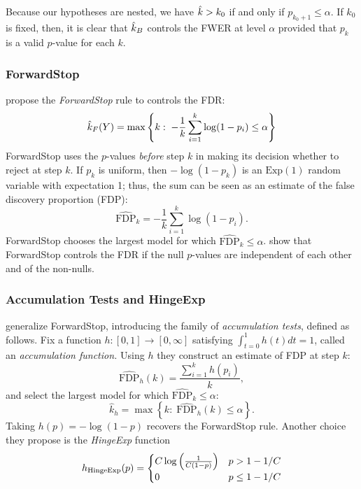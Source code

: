 \documentclass{article}
\begin{document}
Because our hypotheses are nested, we have $\hat{k} > k_0$ if and only if $p_{k_0+1} \leq \alpha$. If $k_0$ is fixed, then, it is clear that $\hat{k}_B$ controls the FWER at level $\alpha$ provided that $p_k$ is a valid $p$-value for each $k$. 

\subsubsection{ForwardStop}

\citet{gsell2013sequential} propose the {\em ForwardStop} rule to controls the FDR:
\[
  \hat{k}_{F}(Y) = \max\left\{k:\;
    -\frac{1}{k}\sum_{i=1}^k \log(1-p_i) \leq \alpha\right\}
\]
ForwardStop uses the $p$-values {\it before} step $k$ in making its decision whether to reject at step $k$. If $p_k$ is uniform, then $-\log(1-p_k)$ is an $\text{Exp}(1)$ random variable with expectation 1; thus, the sum can be seen as an estimate of the false discovery proportion (FDP):
\[
\widehat{\text{FDP}}_k = -\frac{1}{k}\sum_{i=1}^k \log(1-p_i).
\]
ForwardStop chooses the largest model for which $\widehat{\text{FDP}}_k \leq \alpha$. \citet{gsell2013sequential} show that ForwardStop controls the FDR if the null $p$-values are independent of each other and of the non-nulls.

\subsubsection{Accumulation Tests and HingeExp}

\citet{li2015accumulation} generalize ForwardStop, introducing the family of {\em accumulation tests}, defined as follows.
Fix a function $h: [0,1] \rightarrow [0,\infty]$ satisfying $\int_{t=0}^1 h(t)dt=1$, called an {\em accumulation function.} Using $h$ they construct an estimate of FDP at step $k$:
\begin{equation}
\widehat{\text{FDP}}_h(k)= \frac{\sum_{i=1}^k h(p_i)}{k},
\end{equation}
and select the largest model for which $\widehat{\text{FDP}}_k \leq \alpha$:
\begin{equation}
\hat k_h=\max \left\{k:\; \widehat{\text{FDP}}_h(k) \leq \alpha \right\}.
\end{equation}
Taking $h(p)=-\log(1-p)$ recovers the ForwardStop rule. Another choice they propose is the {\em HingeExp} function
\begin{equation}
  h_{\rm HingeExp}(p)= 
  \begin{cases} 
    C\log\left(\frac{1}{C(1-p)} \right)& p> 1-1/C\\
    0 & p\leq 1-1/C
  \end{cases}
\end{equation}
\end{document}
